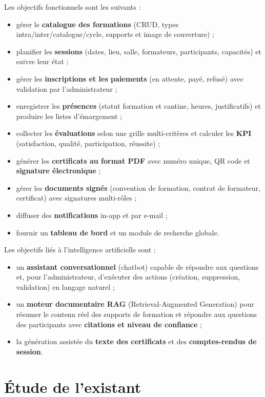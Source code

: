 \documentclass[12pt,a4paper,oneside,openany]{report}
\begin{document}
Les objectifs fonctionnels sont les suivants :
\begin{itemize}
    \item gérer le \textbf{catalogue des formations} (CRUD, types intra/inter/catalogue/cycle, supports et image de couverture) ;
    \item planifier les \textbf{sessions} (dates, lieu, salle, formateurs, participants, capacités) et suivre leur état ;
    \item gérer les \textbf{inscriptions et les paiements} (en attente, payé, refusé) avec validation par l'administrateur ;
    \item enregistrer les \textbf{présences} (statut formation et cantine, heures, justificatifs) et produire les listes d'émargement ;
    \item collecter les \textbf{évaluations} selon une grille multi-critères et calculer les \textbf{KPI} (satisfaction, qualité, participation, réussite) ;
    \item générer les \textbf{certificats au format PDF} avec numéro unique, QR code et \textbf{signature électronique} ;
    \item gérer les \textbf{documents signés} (convention de formation, contrat de formateur, certificat) avec signatures multi-rôles ;
    \item diffuser des \textbf{notifications} in-app et par e-mail ;
    \item fournir un \textbf{tableau de bord} et un module de recherche globale.
\end{itemize}

Les objectifs liés à l'intelligence artificielle sont :
\begin{itemize}
    \item un \textbf{assistant conversationnel} (chatbot) capable de répondre aux questions et, pour l'administrateur, d'exécuter des actions (création, suppression, validation) en langage naturel ;
    \item un \textbf{moteur documentaire RAG} (Retrieval-Augmented Generation) pour résumer le contenu réel des supports de formation et répondre aux questions des participants avec \textbf{citations et niveau de confiance} ;
    \item la génération assistée du \textbf{texte des certificats} et des \textbf{comptes-rendus de session}.
\end{itemize}

\section{Étude de l'existant}
\end{document}
